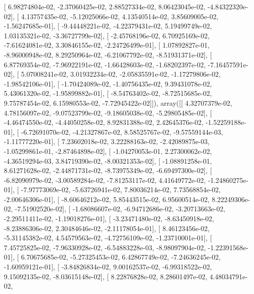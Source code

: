 \documentclass{article}
\begin{document}
       [  6.98274804e-02,  -2.37060425e-02,   2.88527334e-02,
          8.06423045e-02,  -4.84322320e-02],
       [  4.13757435e-02,  -5.12025066e-02,   4.13540514e-02,
          3.85609005e-02,  -1.56247685e-01],
       [ -9.44448221e-02,  -4.22379431e-02,   5.19499749e-02,
          1.03135321e-02,  -3.36727799e-02],
       [ -2.45768196e-02,   6.70925169e-02,  -7.61624081e-02,
          3.30846155e-02,  -2.24726499e-01],
       [  1.07892827e-01,  -8.96000948e-02,   8.29250964e-02,
         -6.21067792e-02,  -8.51931371e-02],
       [  6.87769354e-02,  -7.96922191e-02,  -1.66428603e-02,
         -1.68202397e-02,  -7.16457591e-02],
       [  5.07008241e-02,   3.01932234e-02,  -2.05835591e-02,
         -1.17279806e-02,  -1.98542106e-01],
       [ -1.70424089e-02,  -1.40756435e-02,   9.39431078e-02,
          5.43061320e-02,  -1.95899882e-01],
       [ -8.54763402e-02,  -8.72515685e-02,   9.75787454e-02,
          6.15980553e-02,  -7.72945422e-02]]), array([[  4.32707379e-02,   4.78156097e-02,  -9.07523799e-02,
         -9.18605038e-02,  -5.29805485e-02],
       [ -4.46474550e-02,  -4.44050258e-02,   8.92831388e-02,
          2.42645376e-02,  -1.52259188e-01],
       [ -6.72691070e-02,  -4.21327867e-02,   8.58525767e-02,
         -9.57559144e-03,  -1.11777220e-01],
       [  7.23602018e-02,   3.22288163e-02,  -2.42089875e-03,
         -1.05299861e-01,  -2.87464898e-02],
       [ -1.04270053e-01,   2.27300062e-02,  -4.36519294e-03,
          3.84719390e-02,  -8.00321353e-02],
       [ -1.08891258e-01,   8.61271628e-02,  -2.44871731e-02,
         -8.73975349e-02,  -6.69497300e-02],
       [ -6.82090979e-02,  -3.00589284e-02,  -7.81253117e-02,
          4.41649772e-02,  -1.24860275e-01],
       [ -7.97773069e-02,  -5.63726941e-02,   7.80036214e-02,
          7.73568854e-02,  -2.00646306e-01],
       [ -8.60646212e-02,   5.85443515e-02,   6.95600514e-02,
          8.22249306e-02,  -7.51902520e-02],
       [ -1.68086607e-02,  -6.94712686e-02,  -3.20713663e-02,
         -2.29511411e-02,  -1.19018276e-01],
       [ -3.23471480e-02,  -8.63450918e-02,  -8.23886306e-02,
          2.30484646e-02,  -2.11178054e-01],
       [  8.46123456e-02,  -5.31145382e-02,   4.54579563e-02,
         -4.72756109e-02,  -1.23710001e-01],
       [  7.45725825e-02,  -7.96330928e-02,  -6.54883228e-03,
         -8.98097904e-02,  -1.22391568e-01],
       [  6.70675685e-02,  -5.27325453e-02,   6.42867749e-02,
         -7.24636245e-02,  -1.60959121e-01],
       [ -3.84826834e-02,   9.00162537e-02,  -6.99318522e-02,
          9.15092135e-02,  -8.03615148e-02],
       [  8.22876828e-02,   8.28601497e-02,   4.48034791e-02,
\end{document}
